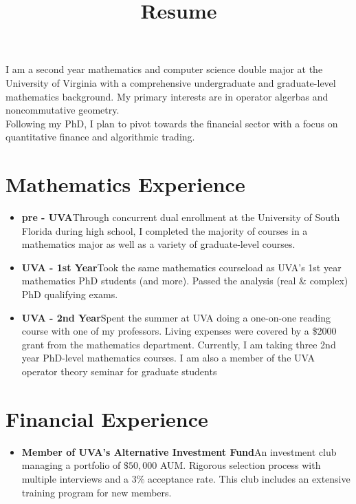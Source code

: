 \documentclass[12pt,letterpaper,sans]{moderncv}
\title{Resume}
\begin{document}
\makecvtitle %
\vspace*{-1.5em}



\begin{center}
  I am a second year mathematics and computer science double major at the University of Virginia with a comprehensive undergraduate and graduate-level mathematics background. My primary interests are in operator algerbas and noncommutative geometry. \\
\vspace{1.0em}
  Following my PhD, I plan to pivot towards the financial sector with a focus on quantitative finance and algorithmic trading.
\end{center}

\section{Mathematics Experience}

\begin{itemize}
  \item \textbf{pre - UVA}\quad Through concurrent dual enrollment at the University of South Florida during high school, I completed the majority of courses in a mathematics major as well as a variety of graduate-level courses.
  \item \textbf{UVA - 1st Year}\quad Took the same mathematics courseload as UVA's 1st year mathematics PhD students (and more). Passed the analysis (real \& complex) PhD qualifying exams.
  \item \textbf{UVA - 2nd Year}\quad Spent the summer at UVA doing a one-on-one reading course with one of my professors. Living expenses were covered by a \$2000 grant from the mathematics department. Currently, I am taking three 2nd year PhD-level mathematics courses. I am also a member of the UVA operator theory seminar for graduate students
\end{itemize}

\section{Financial Experience}
\begin{itemize}
  \item \textbf{Member of UVA's Alternative Investment Fund}\quad An investment club managing a portfolio of $ \$50,000 $ AUM. Rigorous selection process with multiple interviews and a $ 3\% $ acceptance rate. This club includes an extensive training program for new members. 
\end{itemize}
\end{document}
